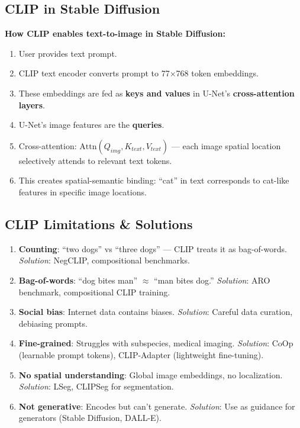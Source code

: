 \subsection{CLIP in Stable Diffusion}
\textbf{How CLIP enables text-to-image in Stable Diffusion:}
\begin{enumerate}
\item User provides text prompt.
\item CLIP text encoder converts prompt to 77$\times$768 token embeddings.
\item These embeddings are fed as \textbf{keys and values} in U-Net's \textbf{cross-attention layers}.
\item U-Net's image features are the \textbf{queries}.
\item Cross-attention: $\text{Attn}(Q_{img}, K_{text}, V_{text})$ — each image spatial location selectively attends to relevant text tokens.
\item This creates spatial-semantic binding: ``cat'' in text corresponds to cat-like features in specific image locations.
\end{enumerate}

\subsection{CLIP Limitations \& Solutions}
\begin{enumerate}
\item \textbf{Counting}: ``two dogs'' vs ``three dogs'' — CLIP treats it as bag-of-words. \textit{Solution}: NegCLIP, compositional benchmarks.
\item \textbf{Bag-of-words}: ``dog bites man'' $\approx$ ``man bites dog.'' \textit{Solution}: ARO benchmark, compositional CLIP training.
\item \textbf{Social bias}: Internet data contains biases. \textit{Solution}: Careful data curation, debiasing prompts.
\item \textbf{Fine-grained}: Struggles with subspecies, medical imaging. \textit{Solution}: CoOp (learnable prompt tokens), CLIP-Adapter (lightweight fine-tuning).
\item \textbf{No spatial understanding}: Global image embeddings, no localization. \textit{Solution}: LSeg, CLIPSeg for segmentation.
\item \textbf{Not generative}: Encodes but can't generate. \textit{Solution}: Use as guidance for generators (Stable Diffusion, DALL-E).
\end{enumerate}

